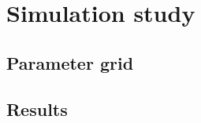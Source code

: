\chapter{Simulation study}
\label{cap:simulation}

\section{Parameter grid}
\label{sec:prior}

\section{Results}
\label{sec:simu}
